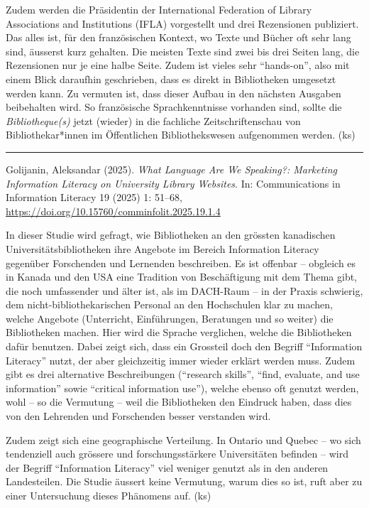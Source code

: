 \documentclass[a4paper,
fontsize=11pt,
oneside,
numbers=noperiodatend,
parskip=half-,
bibliography=totoc,
final
]{scrartcl}
\begin{document}
Zudem werden die Präsidentin der International Federation of Library
Associations and Institutions (IFLA) vorgestellt und drei Rezensionen
publiziert. Das alles ist, für den französischen Kontext, wo Texte und
Bücher oft sehr lang sind, äusserst kurz gehalten. Die meisten Texte
sind zwei bis drei Seiten lang, die Rezensionen nur je eine halbe Seite.
Zudem ist vieles sehr \enquote{hands-on}, also mit einem Blick daraufhin
geschrieben, dass es direkt in Bibliotheken umgesetzt werden kann. Zu
vermuten ist, dass dieser Aufbau in den nächsten Ausgaben beibehalten
wird. So französische Sprachkenntnisse vorhanden sind, sollte die
\emph{Bibliotheque(s)} jetzt (wieder) in die fachliche
Zeitschriftenschau von Bibliothekar*innen im Öffentlichen
Bibliothekswesen aufgenommen werden. (ks)

\begin{center}\rule{0.5\linewidth}{0.5pt}\end{center}

Golijanin, Aleksandar (2025). \emph{What Language Are We Speaking?:
Marketing Information Literacy on University Library Websites}. In:
Communications in Information Literacy 19 (2025) 1: 51--68,
\url{https://doi.org/10.15760/comminfolit.2025.19.1.4}

In dieser Studie wird gefragt, wie Bibliotheken an den grössten
kanadischen Universitätsbibliotheken ihre Angebote im Bereich
Information Literacy gegenüber Forschenden und Lernenden beschreiben. Es
ist offenbar -- obgleich es in Kanada und den USA eine Tradition von
Beschäftigung mit dem Thema gibt, die noch umfassender und älter ist,
als im DACH-Raum -- in der Praxis schwierig, dem
nicht-bibliothekarischen Personal an den Hochschulen klar zu machen,
welche Angebote (Unterricht, Einführungen, Beratungen und so weiter) die
Bibliotheken machen. Hier wird die Sprache verglichen, welche die
Bibliotheken dafür benutzen. Dabei zeigt sich, dass ein Grossteil doch
den Begriff \enquote{Information Literacy} nutzt, der aber gleichzeitig
immer wieder erklärt werden muss. Zudem gibt es drei alternative
Beschreibungen (\enquote{research skills}, \enquote{find, evaluate, and
use information} sowie \enquote{critical information use}), welche
ebenso oft genutzt werden, wohl -- so die Vermutung -- weil die
Bibliotheken den Eindruck haben, dass dies von den Lehrenden und
Forschenden besser verstanden wird.

Zudem zeigt sich eine geographische Verteilung. In Ontario und Quebec --
wo sich tendenziell auch grössere und forschungsstärkere Universitäten
befinden -- wird der Begriff \enquote{Information Literacy} viel weniger
genutzt als in den anderen Landesteilen. Die Studie äussert keine
Vermutung, warum dies so ist, ruft aber zu einer Untersuchung dieses
Phänomens auf. (ks)
\end{document}
